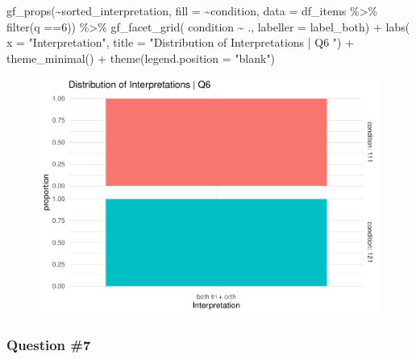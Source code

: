 \documentclass[
  letterpaper,
  DIV=11,
  numbers=noendperiod]{scrreprt}
\newenvironment{Shaded}{\begin{snugshade}}{\end{snugshade}}
\newcommand{\AttributeTok}[1]{\textcolor[rgb]{0.40,0.45,0.13}{#1}}
\newcommand{\DecValTok}[1]{\textcolor[rgb]{0.68,0.00,0.00}{#1}}
\newcommand{\FunctionTok}[1]{\textcolor[rgb]{0.28,0.35,0.67}{#1}}
\newcommand{\NormalTok}[1]{\textcolor[rgb]{0.00,0.23,0.31}{#1}}
\newcommand{\SpecialCharTok}[1]{\textcolor[rgb]{0.37,0.37,0.37}{#1}}
\newcommand{\StringTok}[1]{\textcolor[rgb]{0.13,0.47,0.30}{#1}}
\begin{document}
\begin{Shaded}
\begin{Highlighting}[]
\FunctionTok{gf\_props}\NormalTok{(}\SpecialCharTok{\textasciitilde{}}\NormalTok{sorted\_interpretation, }\AttributeTok{fill =} \SpecialCharTok{\textasciitilde{}}\NormalTok{condition, }\AttributeTok{data =}\NormalTok{ df\_items }\SpecialCharTok{\%\textgreater{}\%} \FunctionTok{filter}\NormalTok{(q }\SpecialCharTok{==}\DecValTok{6}\NormalTok{)) }\SpecialCharTok{\%\textgreater{}\%} 
  \FunctionTok{gf\_facet\_grid}\NormalTok{( condition }\SpecialCharTok{\textasciitilde{}}\NormalTok{ ., }\AttributeTok{labeller =}\NormalTok{ label\_both) }\SpecialCharTok{+} 
  \FunctionTok{labs}\NormalTok{( }\AttributeTok{x =} \StringTok{"Interpretation"}\NormalTok{, }\AttributeTok{title =} \StringTok{"Distribution of Interpretations | Q6 "}\NormalTok{) }\SpecialCharTok{+} 
  \FunctionTok{theme\_minimal}\NormalTok{() }\SpecialCharTok{+} \FunctionTok{theme}\NormalTok{(}\AttributeTok{legend.position =} \StringTok{"blank"}\NormalTok{)}
\end{Highlighting}
\end{Shaded}

\begin{figure}[H]

{\centering \includegraphics{analysis/SGC3A/2_sgc3A_scoring_files/figure-pdf/Q6-distribution-2.pdf}

}

\end{figure}

\hypertarget{question-7}{%
\subsubsection{Question \#7}\label{question-7}}
\end{document}
